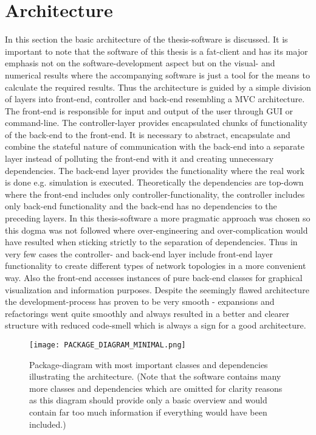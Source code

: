 \documentclass[Bachelorarbeit.tex]{subfiles}
\begin{document}
\section{Architecture}
In this section the basic architecture of the thesis-software is discussed. It is important to note that the software of this thesis is a fat-client and has its major emphasis not on the software-development aspect but on the visual- and numerical results where the accompanying software is just a tool for the means to calculate the required results. Thus the architecture is guided by a simple division of layers into front-end, controller and back-end resembling a MVC architecture. The front-end is responsible for input and output of the user through GUI or command-line. The controller-layer provides encapsulated chunks of functionality of the back-end to the front-end. It is necessary to abstract, encapsulate and combine the stateful nature of communication with the back-end into a separate layer instead of polluting the front-end with it and creating unnecessary dependencies. The back-end layer provides the functionality where the real work is done e.g. simulation is executed.
\medskip
Theoretically the dependencies are top-down where the front-end includes only controller-functionality, the controller includes only back-end functionality and the back-end has no dependencies to the preceding layers. In this thesis-software a more pragmatic approach was chosen so this dogma was not followed where over-engineering and over-complication would have resulted when sticking strictly to the separation of dependencies. Thus in very few cases the controller- and back-end layer include front-end layer functionality to create different types of network topologies in a more convenient way. Also the front-end accesses instances of pure back-end classes for graphical visualization and information purposes. Despite the seemingly flawed architecture the development-process has proven to be very smooth - expansions and refactorings went quite smoothly and always resulted in a better and clearer structure with reduced code-smell which is always a sign for a good architecture.

\begin{figure}[H]
	\centering
  \texttt{[image: PACKAGE\_DIAGRAM\_MINIMAL.png]}
	\caption{Package-diagram with most important classes and dependencies illustrating the architecture. (Note that the software contains many more classes and dependencies which are omitted for clarity reasons as this diagram should provide only a basic overview and would contain far too much information if everything would have been included.)}
	\label{fig:PACKAGE_DIAGRAM_MINIMAL}
\end{figure}
\end{document}
